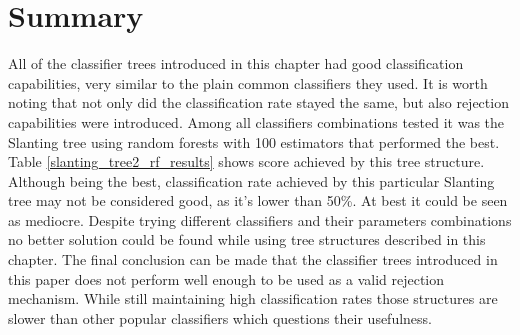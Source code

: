 \section{Summary}

All of the classifier trees introduced in this chapter had good classification capabilities, very similar to the plain common classifiers they used. It is worth noting that not only did the classification rate stayed the same, but also rejection capabilities were introduced. Among all classifiers combinations tested it was the Slanting tree using random forests with 100 estimators that performed the best. Table \ref{slanting_tree2_rf_results} shows score achieved by this tree structure. Although being the best, classification rate achieved by this particular Slanting tree may not be considered good, as it's lower than 50\%. At best it could be seen as mediocre. Despite trying different classifiers and their parameters combinations no better solution could be found while using tree structures described in this chapter. The final conclusion can be made that the classifier trees introduced in this paper does not perform well enough to be used as a valid rejection mechanism. While still maintaining high classification rates those structures are slower than other popular classifiers which questions their usefulness.